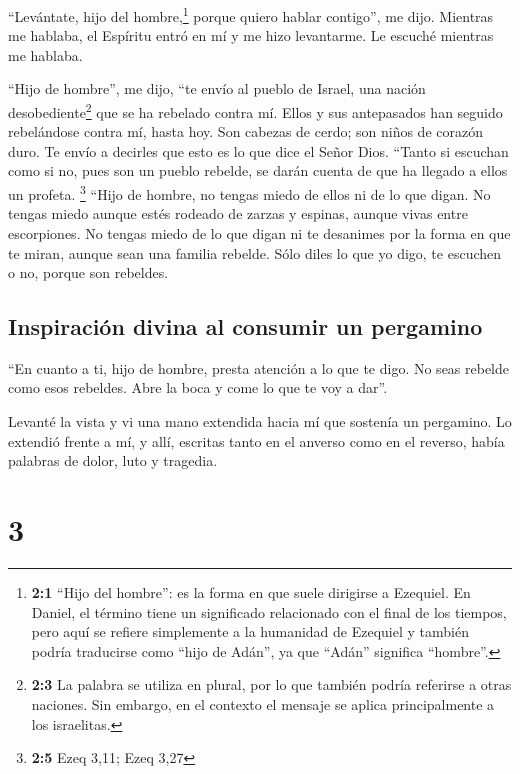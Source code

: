  ``Levántate, hijo del hombre,\footnote{\textbf{2:1}
  ``Hijo del hombre'': es la forma en que suele dirigirse a Ezequiel. En
  Daniel, el término tiene un significado relacionado con el final de
  los tiempos, pero aquí se refiere simplemente a la humanidad de
  Ezequiel y también podría traducirse como ``hijo de Adán'', ya que
  ``Adán'' significa ``hombre''.} porque quiero hablar contigo'', me
dijo.  Mientras me hablaba, el Espíritu entró en mí y me
hizo levantarme. Le escuché mientras me hablaba.

 ``Hijo de hombre'', me dijo, ``te envío al pueblo de
Israel, una nación desobediente\footnote{\textbf{2:3} La palabra se
  utiliza en plural, por lo que también podría referirse a otras
  naciones. Sin embargo, en el contexto el mensaje se aplica
  principalmente a los israelitas.} que se ha rebelado contra mí. Ellos
y sus antepasados han seguido rebelándose contra mí, hasta hoy.
 Son cabezas de cerdo; son niños de corazón duro. Te envío
a decirles que esto es lo que dice el Señor Dios.  ``Tanto
si escuchan como si no, pues son un pueblo rebelde, se darán cuenta de
que ha llegado a ellos un profeta. \footnote{\textbf{2:5} Ezeq 3,11;
  Ezeq 3,27}  ``Hijo de hombre, no tengas miedo de ellos
ni de lo que digan. No tengas miedo aunque estés rodeado de zarzas y
espinas, aunque vivas entre escorpiones. No tengas miedo de lo que digan
ni te desanimes por la forma en que te miran, aunque sean una familia
rebelde.  Sólo diles lo que yo digo, te escuchen o no,
porque son rebeldes.

\hypertarget{inspiraciuxf3n-divina-al-consumir-un-pergamino}{%
\subsection{Inspiración divina al consumir un
pergamino}\label{inspiraciuxf3n-divina-al-consumir-un-pergamino}}

 ``En cuanto a ti, hijo de hombre, presta atención a lo
que te digo. No seas rebelde como esos rebeldes. Abre la boca y come lo
que te voy a dar''.

 Levanté la vista y vi una mano extendida hacia mí que
sostenía un pergamino.  Lo extendió frente a mí, y allí,
escritas tanto en el anverso como en el reverso, había palabras de
dolor, luto y tragedia.

\hypertarget{section-2}{%
\section{3}\label{section-2}}

